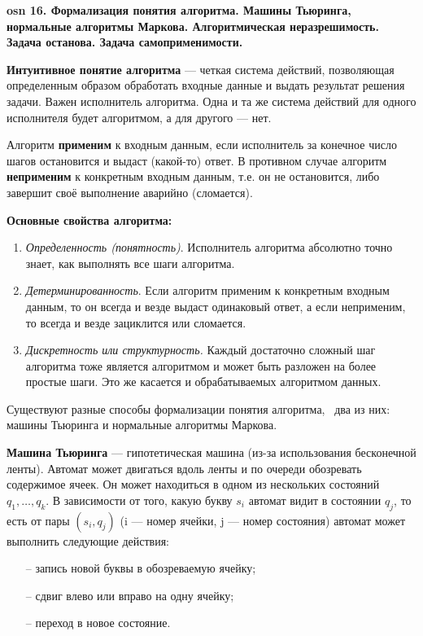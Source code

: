 \textbf{\LARGE osn 16. Формализация понятия алгоритма. Машины Тьюринга, нормальные алгоритмы Маркова. Алгоритмическая неразрешимость. Задача останова. Задача самоприменимости.}


\textbf{Интуитивное понятие алгоритма} --- четкая система действий, позволяющая определенным образом обработать входные данные и выдать результат решения задачи. Важен исполнитель алгоритма. Одна и та же система действий для одного исполнителя будет алгоритмом, а для другого --- нет.

Алгоритм \textbf{применим} к входным данным, если исполнитель за конечное число шагов остановится и выдаст (какой-то) ответ. В противном случае алгоритм \textbf{неприменим} к конкретным входным данным, т.е. он не остановится, либо завершит своё выполнение аварийно (сломается).

\textbf{Основные свойства алгоритма:}
\begin{enumerate}
    \item\textit{Определенность (понятность)}. Исполнитель алгоритма абсолютно точно знает, как выполнять все шаги алгоритма.
    \item \textit{Детерминированность}. Если алгоритм применим к конкретным входным данным, то он всегда и везде выдаст одинаковый ответ, а если неприменим, то всегда и везде зациклится или сломается.
    \item \textit{Дискретность или структурность.} Каждый достаточно сложный шаг алгоритма тоже является алгоритмом и может быть разложен на более простые шаги. Это же касается и обрабатываемых алгоритмом данных.
\end{enumerate}

Существуют разные способы формализации понятия алгоритма, \faEye \ два из них: машины Тьюринга и нормальные алгоритмы Маркова.


\textbf{Машина Тьюринга} --- гипотетическая машина (из-за использования бесконечной ленты). Автомат может двигаться вдоль ленты и по очереди обозревать содержимое ячеек. Он может находиться в одном из нескольких состояний $q_1,\dots, q_k$. В зависимости от того, какую букву $s_i$ автомат видит в состоянии $q_j$, то есть от пары $(s_i,q_j)$ (i --- номер ячейки, j --- номер состояния) автомат может выполнить следующие действия:
\begin{itemize}
    \item[--] запись новой буквы в обозреваемую ячейку; 
    \item[--] сдвиг влево или вправо на одну ячейку;
    \item[--] переход в новое состояние.
\end{itemize}



